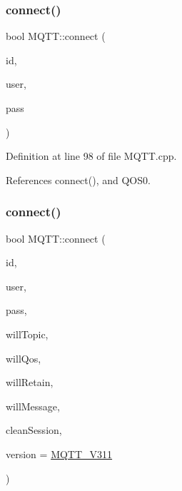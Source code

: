 \mbox{\label{class_m_q_t_t_a280e592fced51964607c66f7ab450b46}} 
\subsubsection{\texorpdfstring{connect()}{connect()}\hspace{0.1cm}{\footnotesize\ttfamily [2/3]}}
{\footnotesize\ttfamily bool M\+Q\+T\+T\+::connect (\begin{DoxyParamCaption}\item[{const char $\ast$}]{id,  }\item[{const char $\ast$}]{user,  }\item[{const char $\ast$}]{pass }\end{DoxyParamCaption})}



Definition at line 98 of file M\+Q\+T\+T.\+cpp.



References connect(), and Q\+O\+S0.

\mbox{\label{class_m_q_t_t_aa880316318b5bdc133c2f8c6bba1e253}} 
\subsubsection{\texorpdfstring{connect()}{connect()}\hspace{0.1cm}{\footnotesize\ttfamily [3/3]}}
{\footnotesize\ttfamily bool M\+Q\+T\+T\+::connect (\begin{DoxyParamCaption}\item[{const char $\ast$}]{id,  }\item[{const char $\ast$}]{user,  }\item[{const char $\ast$}]{pass,  }\item[{const char $\ast$}]{will\+Topic,  }\item[{\hyperlink{class_m_q_t_t_aff501e08e20ebf26b3272fcc0e7215ff}{E\+M\+Q\+T\+T\+\_\+\+Q\+OS}}]{will\+Qos,  }\item[{uint8\+\_\+t}]{will\+Retain,  }\item[{const char $\ast$}]{will\+Message,  }\item[{bool}]{clean\+Session,  }\item[{\hyperlink{class_m_q_t_t_a49430c9d6f68bbdc4e1bd039a6f5f97e}{M\+Q\+T\+T\+\_\+\+V\+E\+R\+S\+I\+ON}}]{version = {\ttfamily \hyperlink{class_m_q_t_t_a49430c9d6f68bbdc4e1bd039a6f5f97eae61f66bbb0b315cf4cb7636684c68602}{M\+Q\+T\+T\+\_\+\+V311}} }\end{DoxyParamCaption})}



